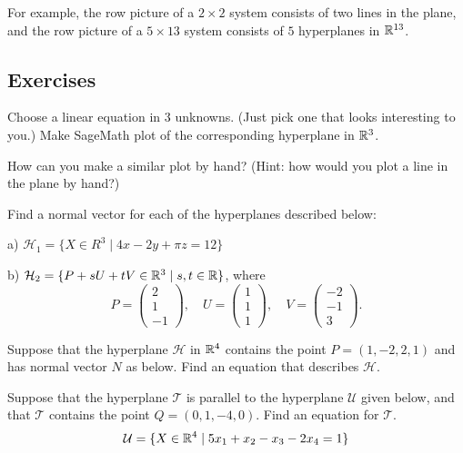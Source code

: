 \documentclass[elementsmain.tex]{subfiles}
\begin{document}
For example, the row picture of a $2\times 2$ system consists of two lines in the plane, and the row picture of a $5\times 13$ system consists of $5$ hyperplanes in $\mathbb{R}^{13}$.


\clearpage

\subsection*{Exercises}

\begin{exercise}
Choose a linear equation in $3$ unknowns. (Just pick one that looks interesting to you.)
Make SageMath plot of the corresponding hyperplane in $\mathbb{R}^3$.

How can you make a similar plot by hand? (Hint: how would you plot a line in the plane by hand?)
\end{exercise}


\begin{exercise}\label{ex:06-findnormals}
Find a normal vector for each of the hyperplanes described below:
\begin{compactenum}
\item[a)] $\mathcal{H}_1 = \{ X \in R^3 \mid 4x-2y + \pi z = 12 \}$
\item[b)] $\mathcal{H}_2 = \{ P + sU + tV \in \mathbb{R}^3 \mid s,t\in\mathbb{R} \}$, where
\[
P = \begin{pmatrix} 2\\1\\-1 \end{pmatrix}, \quad 
U = \begin{pmatrix} 1\\1\\1 \end{pmatrix}, \quad 
V = \begin{pmatrix} -2\\-1\\3 \end{pmatrix}.
\]
\end{compactenum}
\end{exercise}

\begin{exercise}
Suppose that the hyperplane $\mathcal{H}$ in $\mathbb{R}^4$ contains the point $P = (1,-2,2,1)$
and has normal vector $N$ as below. Find an equation that describes $\mathcal{H}$.
\end{exercise}

\begin{exercise}
Suppose that the hyperplane $\mathcal{T}$ is parallel to the hyperplane $\mathcal{U}$ given below, and that $\mathcal{T}$ contains the point $Q = (0,1,-4,0)$. Find an equation for $\mathcal{T}$.
\[
\mathcal{U} = \{ X \in \mathbb{R}^4 \mid 5x_1 + x_2 - x_3 -2x_4 = 1 \}
\]
\end{exercise}
\end{document}
